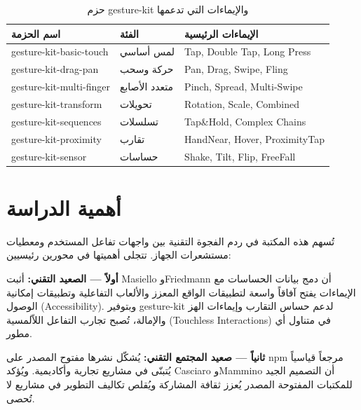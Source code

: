 \begin{Arabic}
\begin{table}[htbp]
\centering
\caption{حزم \textenglish{gesture-kit} والإيماءات التي تدعمها}
\label{tab:packages}
\begin{tabularx}{\textwidth}{XXX}
\toprule
\textbf{اسم الحزمة} & \textbf{الفئة} & \textbf{الإيماءات الرئيسية} \\
\midrule
\textenglish{gesture-kit-basic-touch} & لمس أساسي & \textenglish{Tap, Double Tap, Long Press} \\
\rowcolor{gray!10}
\textenglish{gesture-kit-drag-pan} & حركة وسحب & \textenglish{Pan, Drag, Swipe, Fling} \\
\textenglish{gesture-kit-multi-finger} & متعدد الأصابع & \textenglish{Pinch, Spread, Multi-Swipe} \\
\rowcolor{gray!10}
\textenglish{gesture-kit-transform} & تحويلات & \textenglish{Rotation, Scale, Combined} \\
\textenglish{gesture-kit-sequences} & تسلسلات & \textenglish{Tap\&Hold, Complex Chains} \\
\rowcolor{gray!10}
\textenglish{gesture-kit-proximity} & تقارب & \textenglish{HandNear, Hover, ProximityTap} \\
\textenglish{gesture-kit-sensor} & حساسات & \textenglish{Shake, Tilt, Flip, FreeFall} \\
\bottomrule
\end{tabularx}
\end{table}

\section{أهمية الدراسة}

تُسهم هذه المكتبة في ردم الفجوة التقنية بين واجهات تفاعل المستخدم ومعطيات مستشعرات الجهاز. تتجلى أهميتها في محورين رئيسيين:

\textbf{أولاً --- الصعيد التقني:} أثبت \textenglish{Masiello} و\textenglish{Friedmann} \cite{masiello2017} أن دمج بيانات الحساسات مع الإيماءات يفتح آفاقاً واسعة لتطبيقات الواقع المعزز والألعاب التفاعلية وتطبيقات إمكانية الوصول (\textenglish{Accessibility}). وبتوفير \textenglish{gesture-kit} لدعم حساس التقارب وإيماءات الهز والإمالة، تُصبح تجارب التفاعل اللاّلمسية (\textenglish{Touchless Interactions}) في متناول أي مطور.

\textbf{ثانياً --- صعيد المجتمع التقني:} يُشكّل نشرها مفتوح المصدر على \textenglish{npm} مرجعاً قياسياً يُتبنّى في مشاريع تجارية وأكاديمية. ويُؤكد \textenglish{Casciaro} و\textenglish{Mammino} \cite{casciaro2020} أن التصميم الجيد للمكتبات المفتوحة المصدر يُعزز ثقافة المشاركة ويُقلص تكاليف التطوير في مشاريع لا تُحصى.


\end{Arabic}
